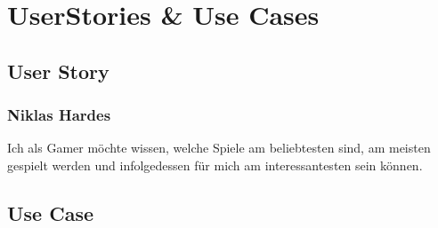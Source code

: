 \section{UserStories \& Use Cases}

\subsection{User Story}

\subsubsection{Niklas Hardes}

Ich als Gamer möchte wissen, welche Spiele am beliebtesten sind, am meisten gespielt werden und infolgedessen für mich am interessantesten sein können.

\subsection{Use Case}
